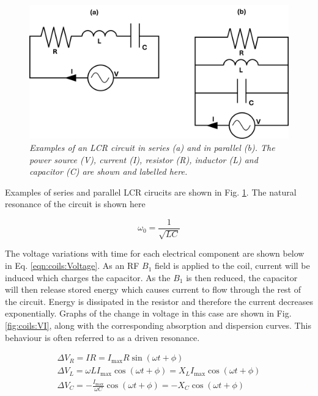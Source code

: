 \begin{figure}
    \centering
    \includegraphics[width=0.9\linewidth]{Figures/Coils/RLC_Circuit.png}
    \caption{\textit{Examples of an LCR circuit in series (a) and in parallel (b). The power source (V), current (I), resistor (R), inductor (L) and capacitor (C) are shown and labelled here.}}
    \label{fig:coils:RLC}
\end{figure}

Examples of series and parallel LCR cirucits are shown in Fig. \ref{fig:coils:RLC}. The natural resonance of the circuit is shown here

\begin{equation}
    \omega_0 = \frac{1}{\sqrt{LC}}
    \label{eqn:coils:res}
\end{equation}

The voltage variations with time for each electrical component are shown below in Eq. \ref{eqn:coils:Voltage}. As an \ac{RF} $B_1$ field is applied to the coil, current will be induced which charges the capacitor. As the $B_1$ is then reduced, the capacitor will then release stored energy which causes current to flow through the rest of the circuit. Energy is dissipated in the resistor and therefore the current decreases exponentially. Graphs of the change in voltage in this case are shown in Fig. \ref{fig:coils:VI}, along with the corresponding absorption and dispersion curves. This behaviour is often referred to as a driven resonance.

\begin{equation}
\begin{gathered}
    \Delta V_R = IR = I_{\mathrm{max}}R\sin(\omega t + \phi) \\
    \Delta V_L = \omega LI_{\mathrm{max}}\cos(\omega t + \phi) =  X_LI_{\mathrm{max}}\cos(\omega t + \phi)\\
    \Delta V_C = -\frac{I_{\mathrm{max}}}{\omega C}\cos(\omega t + \phi) = -X_C\cos(\omega t + \phi)\\
    \label{eqn:coils:Voltage}
\end{gathered}
\end{equation}

